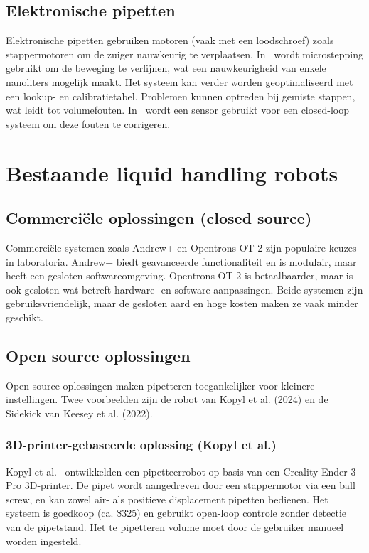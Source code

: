\subsection{Elektronische pipetten} 
Elektronische pipetten gebruiken motoren (vaak met een loodschroef) zoals stappermotoren om de zuiger nauwkeurig te verplaatsen. In\ \cite{RN35} wordt microstepping gebruikt om de beweging te verfijnen, wat een nauwkeurigheid van enkele nanoliters mogelijk maakt. Het systeem kan verder worden geoptimaliseerd met een lookup- en calibratietabel. Problemen kunnen optreden bij gemiste stappen, wat leidt tot volumefouten. In\ \cite{RN36} wordt een sensor gebruikt voor een closed-loop systeem om deze fouten te corrigeren.

\section{Bestaande liquid handling robots} 
\subsection{Commerciële oplossingen (closed source)} 
Commerciële systemen zoals Andrew+ en Opentrons OT-2 zijn populaire keuzes in laboratoria. Andrew+ biedt geavanceerde functionaliteit en is modulair, maar heeft een gesloten softwareomgeving. Opentrons OT-2 is betaalbaarder, maar is ook gesloten wat betreft hardware- en software-aanpassingen. Beide systemen zijn gebruiksvriendelijk, maar de gesloten aard en hoge kosten maken ze vaak minder geschikt.

\subsection{Open source oplossingen} 
Open source oplossingen maken pipetteren toegankelijker voor kleinere instellingen. Twee voorbeelden zijn de robot van Kopyl et al. (2024) en de Sidekick van Keesey et al. (2022).

\subsubsection{3D-printer-gebaseerde oplossing (Kopyl et al.)} 
Kopyl et al.\ \cite{RN42} ontwikkelden een pipetteerrobot op basis van een Creality Ender 3 Pro 3D-printer. De pipet wordt aangedreven door een stappermotor via een ball screw, en kan zowel air- als positieve displacement pipetten bedienen. Het systeem is goedkoop (ca. \$325) en gebruikt open-loop controle zonder detectie van de pipetstand. Het te pipetteren volume moet door de gebruiker manueel worden ingesteld.

